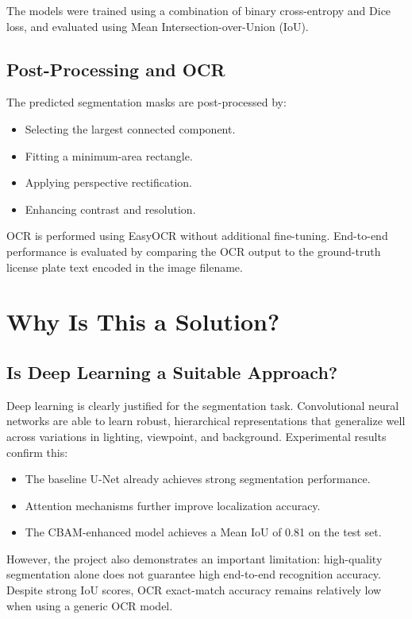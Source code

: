 \documentclass[11pt,a4paper]{article}
\begin{document}
The models were trained using a combination of binary cross-entropy and Dice loss, and evaluated using Mean Intersection-over-Union (IoU).

\subsection{Post-Processing and OCR}

The predicted segmentation masks are post-processed by:
\begin{itemize}
    \item Selecting the largest connected component.
    \item Fitting a minimum-area rectangle.
    \item Applying perspective rectification.
    \item Enhancing contrast and resolution.
\end{itemize}

OCR is performed using EasyOCR without additional fine-tuning. End-to-end performance is evaluated by comparing the OCR output to the ground-truth license plate text encoded in the image filename.

\section{Why Is This a Solution?}

\subsection{Is Deep Learning a Suitable Approach?}

Deep learning is clearly justified for the segmentation task. Convolutional neural networks are able to learn robust, hierarchical representations that generalize well across variations in lighting, viewpoint, and background. Experimental results confirm this:

\begin{itemize}
    \item The baseline U-Net already achieves strong segmentation performance.
    \item Attention mechanisms further improve localization accuracy.
    \item The CBAM-enhanced model achieves a Mean IoU of 0.81 on the test set.
\end{itemize}

However, the project also demonstrates an important limitation: high-quality segmentation alone does not guarantee high end-to-end recognition accuracy. Despite strong IoU scores, OCR exact-match accuracy remains relatively low when using a generic OCR model.
\end{document}
